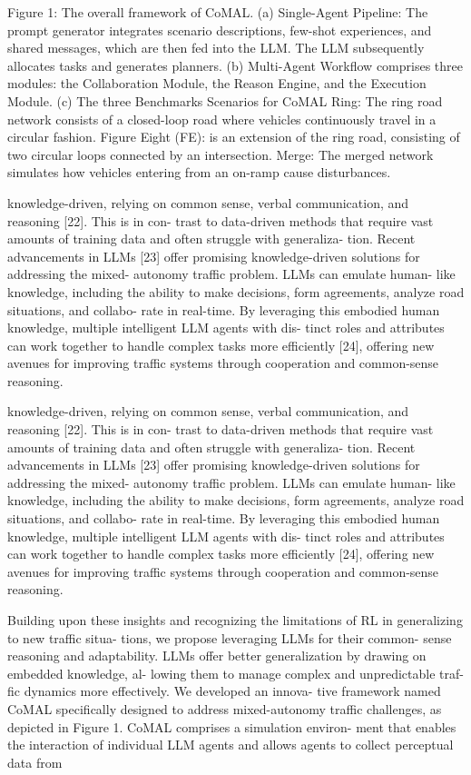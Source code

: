 \documentclass[12pt]{article}
\begin{document}
Figure 1: The overall framework of CoMAL. (a) Single-Agent Pipeline: The prompt generator integrates scenario
descriptions, few-shot experiences, and shared messages, which are then fed into the LLM. The LLM subsequently
allocates tasks and generates planners. (b) Multi-Agent Workflow comprises three modules: the Collaboration
Module, the Reason Engine, and the Execution Module. (c) The three Benchmarks Scenarios for CoMAL Ring:
The ring road network consists of a closed-loop road where vehicles continuously travel in a circular fashion.
Figure Eight (FE): is an extension of the ring road, consisting of two circular loops connected by an intersection.
Merge: The merged network simulates how vehicles entering from an on-ramp cause disturbances.


knowledge-driven, relying on common sense, verbal
communication, and reasoning [22]. This is in con-
trast to data-driven methods that require vast amounts
of training data and often struggle with generaliza-
tion. Recent advancements in LLMs [23] offer promising
knowledge-driven solutions for addressing the mixed-
autonomy traffic problem. LLMs can emulate human-
like knowledge, including the ability to make decisions,
form agreements, analyze road situations, and collabo-
rate in real-time. By leveraging this embodied human
knowledge, multiple intelligent LLM agents with dis-
tinct roles and attributes can work together to handle
complex tasks more efficiently [24], offering new avenues
for improving traffic systems through cooperation and
common-sense reasoning.


knowledge-driven, relying on common sense, verbal
communication, and reasoning [22]. This is in con-
trast to data-driven methods that require vast amounts
of training data and often struggle with generaliza-
tion. Recent advancements in LLMs [23] offer promising
knowledge-driven solutions for addressing the mixed-
autonomy traffic problem. LLMs can emulate human-
like knowledge, including the ability to make decisions,
form agreements, analyze road situations, and collabo-
rate in real-time. By leveraging this embodied human
knowledge, multiple intelligent LLM agents with dis-
tinct roles and attributes can work together to handle
complex tasks more efficiently [24], offering new avenues
for improving traffic systems through cooperation and
common-sense reasoning.


Building upon these insights and recognizing the
limitations of RL in generalizing to new traffic situa-
tions, we propose leveraging LLMs for their common-
sense reasoning and adaptability. LLMs offer better
generalization by drawing on embedded knowledge, al-
lowing them to manage complex and unpredictable traf-
fic dynamics more effectively. We developed an innova-
tive framework named CoMAL specifically designed to
address mixed-autonomy traffic challenges, as depicted
in Figure 1. CoMAL comprises a simulation environ-
ment that enables the interaction of individual LLM
agents and allows agents to collect perceptual data from
\end{document}
